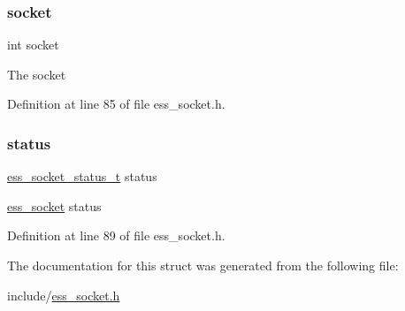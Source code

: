 \subsubsection{\texorpdfstring{socket}{socket}}
{\footnotesize\ttfamily int socket}

The socket 

Definition at line 85 of file ess\+\_\+socket.\+h.

\mbox{\label{structess__socket_a4e47521e8af756b9edf77f1f02f9b725}} 
\subsubsection{\texorpdfstring{status}{status}}
{\footnotesize\ttfamily \hyperlink{ess__socket_8h_ae3a6dc482fc34f9ea0361820ba4be573}{ess\+\_\+socket\+\_\+status\+\_\+t} status}

\hyperlink{structess__socket}{ess\+\_\+socket} status 

Definition at line 89 of file ess\+\_\+socket.\+h.



The documentation for this struct was generated from the following file\+:\begin{DoxyCompactItemize}
\item 
include/\hyperlink{ess__socket_8h}{ess\+\_\+socket.\+h}\end{DoxyCompactItemize}
